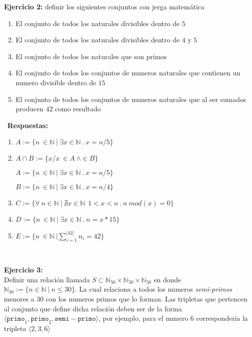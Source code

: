 \documentclass[10pt,a4paper]{article}
\begin{document}
{\bf Ejercicio 2:} definir los siguientes conjuntos con jerga matemática
\
\begin{enumerate}
	\item{El conjunto de todos los naturales divisibles dentro de $5$}
	\item{El conjunto de todos los naturales divisibles dentro de $4$ y $5$}
	\item{El conjunto de todos los naturales que son primos}
	\item{El conjunto de todos los conjuntos de numeros naturales que contienen
		un numero divisible dentro de $15$}
	\item{El conjunto de todos los conjuntos de numeros naturales que al ser sumados
		producen $42$ como resultado}
\end{enumerate}
\
{\bf Respuestas:}
\begin{enumerate} 
	
	\item{$A:=\{n\ \in \mathbb{N}\ |\ \exists x \in \mathbb{N}\ .\ x=n/5 \}$}
	
	\item{$A \cap B:=\{x/x\ \in A\ \wedge  \in B \}$} 
	
	{$A:=\{n\ \in \mathbb{N}\ |\ \exists x \in \mathbb{N}\ .\ x=n/5 \}$}
	
	{$B:=\{n\ \in \mathbb{N}\ |\ \exists x \in \mathbb{N}\ .\ x=n/4 \}$}
	
	\item {$C:= \{ \forall \ n \in \mathbb{N}\ | \ \nexists  x \in \mathbb{N}\ \ 1 < x < n \ . \ n \ mod(x) = 0 \} $}
	
	\item 	{$D:=\{n\ \in \mathbb{N}\ |\ \exists x \in \mathbb{N}\ .\ n=x*15 \}$}
	
	\item 	{$E:=\{n\ \in \mathbb{N}\ | \sum_{i=1}^{|42|} n_i = 42 \}$}
	
 \end{enumerate}
   \
  
  {\bf Ejercicio 3:} 
  \\
  Definir una relaci\'on llamada $S\subset \mathbb{N}_{50}\times\mathbb{N}_{50}\times\mathbb{N}_{50}$ en donde $\mathbb{N}_{30}:=\{ n \in \mathbb{N}\ |\ n\leq 30 \}$. La cual relaciona a todos los numeros
  \emph{semi-primos} menores a $30$ con los numeros primos que lo forman. Las tripletas que pertencen
  al conjunto que define dicha relaci\'on deben ser de la forma $\langle \mathtt{primo}_1,\mathtt{primo}_2,
  \mathtt{semi-primo} \rangle$, por ejemplo, para el numero $6$ corresponderia la tripleta $\langle 2,3,6 \rangle$
  
\end{document}
